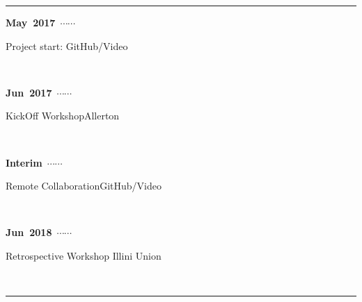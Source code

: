 \newcommand\ytl[2]{\parbox[b]{0.3\textwidth}{\hfill{\color{orange!90}\bfseries\sffamily #1}~$\cdots\cdots$~}\makebox[0pt][c]{$\bullet$}\vrule\quad 
\parbox[c]{0.7\textwidth}{\vspace{7pt}\color{dblue!80}\raggedright\sffamily #2\\[7pt]}\\[-3pt]}
\begin{table}
\centering
\begin{minipage}[t]{\linewidth}
\color{gray}
\rule{\linewidth}{1pt}
\ytl{May~2017}{Project start: \hfill GitHub/Video}
\ytl{Jun~2017}{KickOff Workshop\hfill Allerton}
\ytl{Interim}{Remote Collaboration\hfill GitHub/Video}
\ytl{Jun~2018}{Retrospective Workshop \hfill Illini Union}
\bigskip
\rule{\linewidth}{1pt}%
\end{minipage}%
\end{table}
